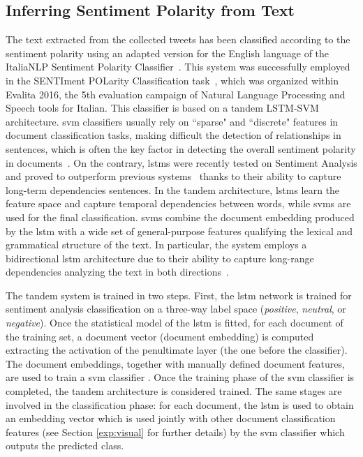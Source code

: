 
\subsection{Inferring Sentiment Polarity from Text}
\label{subsec:vsa:method}

The text extracted from the collected tweets has been classified according to the sentiment polarity using an adapted version for the English language of the ItaliaNLP Sentiment Polarity Classifier~\cite{cimino2016tandem}.
This system was successfully employed in the SENTIment POLarity Classification task~\cite{barbieri2016overview}, which was organized within Evalita 2016, the 5th evaluation campaign of Natural Language Processing and Speech tools for Italian.
This classifier is based on a tandem LSTM-SVM architecture.
\gls{svm} classifiers usually rely on ``sparse" and ``discrete" features in document classification tasks, making difficult the detection of relationships in sentences, which is often the key factor in detecting the overall sentiment polarity in documents~\cite{tang2015document}.
On the contrary, \glspl{lstm} were recently tested on Sentiment Analysis and proved to outperform previous systems~\cite{nakov2016semeval} thanks to their ability to capture long-term dependencies sentences.
In the tandem architecture, \glspl{lstm} learn the feature space and capture temporal dependencies between words, while \glspl{svm} are used for the final classification.
\glspl{svm} combine the document embedding produced by the \gls{lstm} with a wide set of general-purpose features qualifying the lexical and grammatical structure of the text.
In particular, the system employs a bidirectional \gls{lstm} architecture due to their ability to capture long-range dependencies analyzing the text in both directions~\cite{schuster1997bidirectional}.

The tandem system is trained in two steps.
First, the \gls{lstm} network is trained for sentiment analysis classification on a three-way label space (\emph{positive}, \emph{neutral}, or \emph{negative}).
Once the statistical model of the \gls{lstm} is fitted, for each document of the training set, a document vector (document embedding) is computed extracting the activation of the penultimate layer (the one before the classifier).
The document embeddings, together with manually defined document features, are used to train a \gls{svm} classifier .
Once the training phase of the \gls{svm} classifier is completed, the tandem architecture is considered trained.
The same stages are involved in the classification phase: for each document, the \gls{lstm} is used to obtain an embedding vector which is used jointly with other document classification features (see Section \ref{exp:visual} for further details) by the \gls{svm} classifier which outputs the predicted class.

